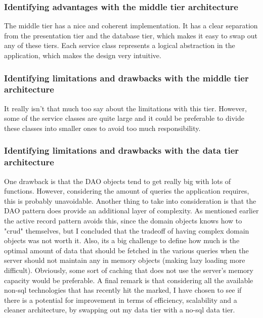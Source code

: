  \subsubsection{Identifying advantages with the middle tier architecture}
	The middle tier has a nice and coherent implementation. It has a clear separation from the presentation tier and the database tier, which makes it easy to swap out any of these tiers. Each service class represents a logical abstraction in the application,  which makes the design very intuitive.
	
	\subsubsection{Identifying limitations and drawbacks with the middle tier architecture}
	It really isn't that much too say about the limitations with this tier. However, some of the service classes are quite large and it could be preferable to divide these classes into smaller ones to avoid too much responsibility. 
	
	
	
	
	
	
	
	
			\subsubsection{Identifying limitations and drawbacks with the data tier architecture}
		One drawback is that the DAO objects tend to get really big with lots of functions. However, considering the amount of queries the application requires, this is probably unavoidable. Another thing to take into consideration is that the DAO pattern does provide an additional layer of complexity. As mentioned earlier the active record pattern avoids this, since the domain objects knows how to "crud" themselves, but I concluded that the tradeoff of having complex domain objects was not worth it.
		 Also, its a big challenge to define how much is the optimal amount of data that should be fetched in the various queries when the server should not maintain any in memory objects (making lazy loading more difficult). Obviously, some sort of caching that does not use the server's memory capacity would be preferable. 
		 A final remark is that considering all the available non-sql technologies that has recently hit the marked, I have chosen to see if there is a potential for improvement in terms of efficiency, scalability and a cleaner architecture, by swapping out my data tier with a no-sql data tier. 
		
